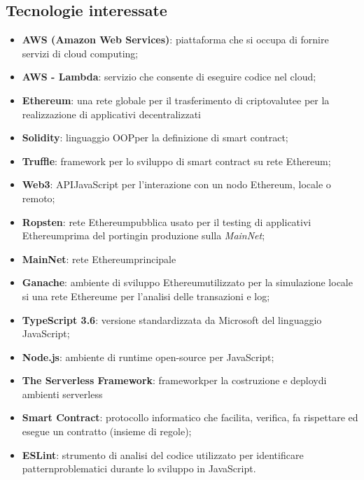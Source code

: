 \subsection{Tecnologie interessate}
\begin{itemize}
	\item \textbf{AWS (Amazon Web Services)}: piattaforma che si occupa di fornire servizi di cloud computing\glos;
	\item \textbf{AWS - Lambda}: servizio che consente di eseguire codice nel cloud\glos;
	\item \textbf{Ethereum}: una rete globale per il trasferimento di criptovalute\glo e per la realizzazione di applicativi decentralizzati
	\item \textbf{Solidity}: linguaggio OOP\glo per la definizione di smart contract\glos;
	\item \textbf{Truffle}: framework per lo sviluppo di smart contract su rete Ethereum\glos;
	\item \textbf{Web3}: API\glo JavaScript per l'interazione con un nodo Ethereum\glos, locale o remoto;
	\item \textbf{Ropsten}: rete Ethereum\glo pubblica usato per il testing di applicativi Ethereum\glo prima del porting\glo in produzione sulla \textit{MainNet};
	\item \textbf{MainNet}: rete Ethereum\glo principale
	\item \textbf{Ganache}: ambiente di sviluppo Ethereum\glo utilizzato per la simulazione locale si una rete Ethereum\glo e per l'analisi delle transazioni e log;
	\item \textbf{TypeScript 3.6}: versione standardizzata da Microsoft del linguaggio JavaScript;
	\item \textbf{Node.js}: ambiente di runtime open-source per JavaScript;
	\item \textbf{The Serverless Framework}: framework\glo per la costruzione e deploy\glo di ambienti serverless\glo
	\item \textbf{Smart Contract}: protocollo informatico che facilita, verifica, fa rispettare ed esegue un contratto (insieme di regole);
	\item \textbf{ESLint}: strumento di analisi del codice utilizzato per identificare pattern\glo problematici durante lo sviluppo in JavaScript.
\end{itemize}

